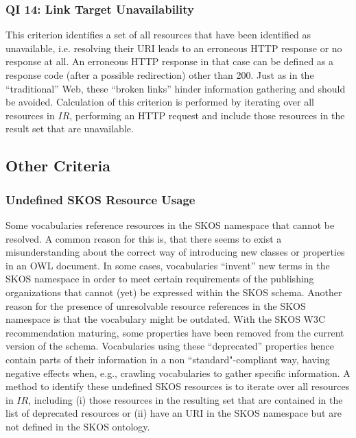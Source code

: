 \subsubsection{QI 14: Link Target Unavailability} 
This criterion identifies a set of all resources that have been identified as unavailable, i.e. resolving their URI leads to an erroneous HTTP response or no response at all. An erroneous HTTP response in that case can be defined as a response code (after a possible redirection) other than 200. Just as in the ``traditional'' Web, these ``broken links'' hinder information gathering and should be avoided. 
Calculation of this criterion is performed by iterating over all resources in $IR$, performing an HTTP request and include those resources in the result set that are unavailable.


\subsection{Other Criteria}

\subsubsection{Undefined SKOS Resource Usage}
Some vocabularies reference resources in the SKOS namespace that cannot be resolved. A common reason for this is, that there seems to exist a misunderstanding about the correct way of introducing new classes or properties in an OWL document. In some cases, vocabularies ``invent'' new terms in the SKOS namespace in order to meet certain requirements of the publishing organizations that cannot (yet) be expressed within the SKOS schema. Another reason for the presence of unresolvable resource references in the SKOS namespace is that the vocabulary might be outdated. With the SKOS W3C recommendation maturing, some properties have been removed from the current version of the schema. Vocabularies using these ``deprecated'' properties hence contain parts of their information in a non ``standard"-compliant way, having negative effects when, e.g., crawling vocabularies to gather specific information. A method to identify these undefined SKOS resources is to iterate over all resources in $IR$, including (i) those resources in the resulting set that are contained in the list of deprecated resources or (ii) have an URI in the SKOS namespace but are not defined in the SKOS ontology. 

